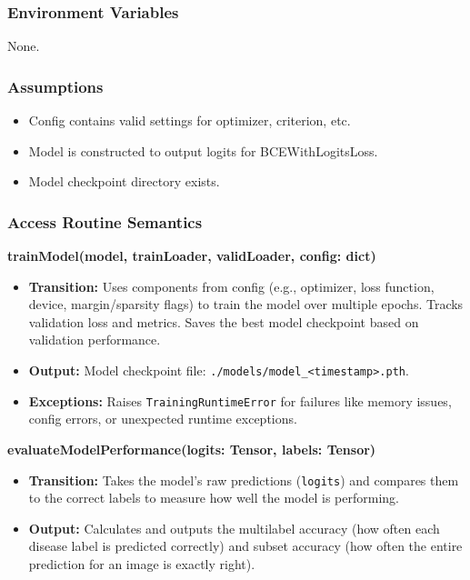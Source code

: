 \documentclass[12pt, titlepage]{article}
\begin{document}
\subsubsection{Environment Variables}
\label{sec:TrainingEnvVariables}

None.

\subsubsection{Assumptions}
\label{sec:TrainingAssumptions}

\begin{itemize}
    \item Config contains valid settings for optimizer, criterion, etc.
    \item Model is constructed to output logits for BCEWithLogitsLoss.
    \item Model checkpoint directory exists.
\end{itemize}

\subsubsection{Access Routine Semantics}
\label{sec:TrainingAccessRoutineSemantics}

\textbf{trainModel(model, trainLoader, validLoader, config: dict)}

\begin{itemize}
    \item \textbf{Transition:} Uses components from config (e.g., optimizer, loss function, device, margin/sparsity flags) to train the model over multiple epochs. Tracks validation loss and metrics. Saves the best model checkpoint based on validation performance.
    \item \textbf{Output:} Model checkpoint file: \texttt{./models/model\_<timestamp>.pth}.
    \item \textbf{Exceptions:} Raises \texttt{TrainingRuntimeError} for failures like memory issues, config errors, or unexpected runtime exceptions.
\end{itemize}

\textbf{evaluateModelPerformance(logits: Tensor, labels: Tensor)}

\begin{itemize}
    \item \textbf{Transition:} Takes the model's raw predictions (\texttt{logits}) and compares them to the correct labels to measure how well the model is performing.
    \item \textbf{Output:} Calculates and outputs the multilabel accuracy (how often each disease label is predicted correctly) and subset accuracy (how often the entire prediction for an image is exactly right).
\end{itemize}
\end{document}
